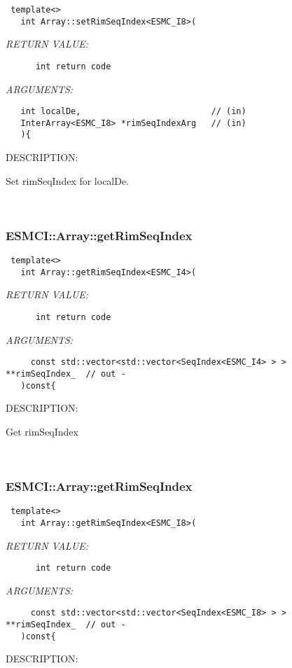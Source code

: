   
\begin{verbatim} template<>
   int Array::setRimSeqIndex<ESMC_I8>(\end{verbatim}{\em RETURN VALUE:}
\begin{verbatim}      int return code\end{verbatim}{\em ARGUMENTS:}
\begin{verbatim}   int localDe,                          // (in)
   InterArray<ESMC_I8> *rimSeqIndexArg   // (in)
   ){\end{verbatim}
{\sf DESCRIPTION:\\ }


      Set rimSeqIndex for localDe.
   
 
\mbox{}\hrulefill\
 
\subsubsection [ESMCI::Array::getRimSeqIndex] {ESMCI::Array::getRimSeqIndex}


  
\begin{verbatim} template<>
   int Array::getRimSeqIndex<ESMC_I4>(\end{verbatim}{\em RETURN VALUE:}
\begin{verbatim}      int return code\end{verbatim}{\em ARGUMENTS:}
\begin{verbatim}     const std::vector<std::vector<SeqIndex<ESMC_I4> > > **rimSeqIndex_  // out -
   )const{\end{verbatim}
{\sf DESCRIPTION:\\ }


      Get rimSeqIndex
   
 
\mbox{}\hrulefill\
 
\subsubsection [ESMCI::Array::getRimSeqIndex] {ESMCI::Array::getRimSeqIndex}


  
\begin{verbatim} template<>
   int Array::getRimSeqIndex<ESMC_I8>(\end{verbatim}{\em RETURN VALUE:}
\begin{verbatim}      int return code\end{verbatim}{\em ARGUMENTS:}
\begin{verbatim}     const std::vector<std::vector<SeqIndex<ESMC_I8> > > **rimSeqIndex_  // out -
   )const{\end{verbatim}
{\sf DESCRIPTION:\\ }


